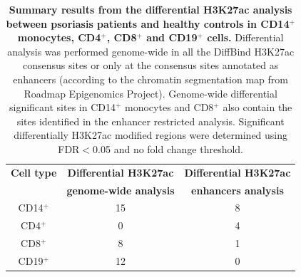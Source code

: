 \begin{table}[htbp]
\centering
\begin{tabular}{@{} c c c}
\toprule
\textbf{Cell type}   & \textbf{Differential H3K27ac}      & \textbf{Differential H3K27ac}      \\
                     & \textbf{genome-wide analysis}              & \textbf{enhancers analysis}     \\
\midrule
\midrule
CD14$^+$             & 15                 & 8                                \\
CD4$^+$              & 0                  & 4																	\\
CD8$^+$              & 8                  & 1                                 \\ 
CD19$^+$             & 12                 & 0                                 \\
\bottomrule 
\end{tabular}
\medskip %
\caption[Summary results from the differential H3K27ac analysis between psoriasis patients and healthy controls in CD14$^+$ monocytes, CD4$^+$, CD8$^+$ and CD19$^+$ cells.]{\textbf{Summary results from the differential H3K27ac analysis between psoriasis patients and healthy controls in CD14$^+$ monocytes, CD4$^+$, CD8$^+$ and CD19$^+$ cells.} Differential analysis was performed genome-wide in all the DiffBind H3K27ac consensus sites or only at the consensus sites annotated as enhancers (according to the chromatin segmentation map from Roadmap Epigenomics Project). Genome-wide differential significant sites in CD14$^+$ monocytes and CD8$^+$ also contain the sites identified in the enhancer restricted analysis. Significant differentially H3K27ac modified regions were determined using FDR$<$0.05 and no fold change threshold.}
\label{tab:ChIPm_differential_analysis_results}
\end{table}
\bigskip %


